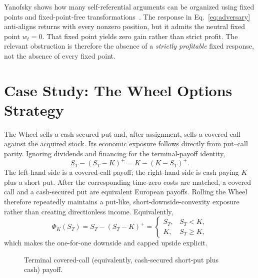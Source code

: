 \documentclass[aps,pra,reprint,superscriptaddress,amsmath,amssymb,floatfix]{revtex4-2}
\theoremstyle{plain}
\theoremstyle{definition}
\theoremstyle{remark}
\begin{document}
Yanofsky shows how many self-referential arguments can be organized using
fixed points and fixed-point-free transformations~\cite{Yanofsky-BSL:9051621}.
The response in Eq.~\eqref{eq:adversary} anti-aligns returns with every
nonzero position, but it admits the neutral fixed point \(w_t=0\). That fixed
point yields zero gain rather than strict profit. The relevant obstruction is
therefore the absence of a \emph{strictly profitable} fixed response, not the
absence of every fixed point.

\section{Case Study: The Wheel Options Strategy}
\label{sec:wheel}

The Wheel sells a cash-secured put and, after assignment, sells a covered call
against the acquired stock. Its economic exposure follows directly from
put--call parity. Ignoring dividends and financing for the terminal-payoff
identity,
\begin{equation}
  S_T-(S_T-K)^+
  =K-(K-S_T)^+.
  \label{eq:putcall}
\end{equation}
The left-hand side is a covered-call payoff; the right-hand side is cash
paying \(K\) plus a short put. After the corresponding time-zero costs are
matched, a covered call and a cash-secured put are equivalent European
payoffs. Rolling the Wheel therefore repeatedly maintains a put-like,
short-downside-convexity exposure rather than creating directionless income.
Equivalently,
\begin{equation}
  \Phi_K(S_T)
  =S_T-(S_T-K)^+
  =
  \begin{cases}
    S_T,&S_T<K,\\
    K,&S_T\geq K,
  \end{cases}
  \label{eq:wheelpiecewise}
\end{equation}
which makes the one-for-one downside and capped upside explicit.

\begin{figure}[t]
\centering
{}
\caption{\label{fig:wheelpayoff}Terminal covered-call (equivalently,
cash-secured short-put plus cash) payoff.}
\end{figure}
\end{document}
